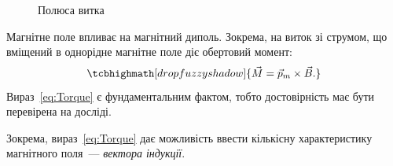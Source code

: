 \documentclass{LabWork}
\begin{document}
\begin{figure}\centering
	\caption{Полюса витка}
	\label{pic:gimlet}
\end{figure}

Магнітне поле впливає на магнітний диполь. Зокрема, на виток зі струмом, що вміщений в однорідне магнітне поле діє обертовий момент:
\begin{equation}\label{eq:Torque}
	\tcbhighmath[drop fuzzy shadow]{
		\vec{M} = \vec{p}_m\times \vec{B}.
	}
\end{equation}
Вираз~\eqref{eq:Torque} є фундаментальним фактом, тобто достовірність має бути перевірена на досліді.

Зокрема, вираз~\eqref{eq:Torque} дає можливість ввести кількісну характеристику  магнітного поля~--- \emph{вектора індукції}.
\end{document}
